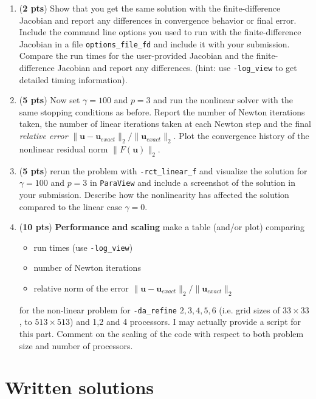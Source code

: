 \documentclass[11pt]{article}
\begin{document}
\begin{enumerate}
    \item (\textbf{2 pts}) Show that you get the same solution with the finite-difference Jacobian and report any differences in convergence behavior or final error. Include the command line options you used to run with the finite-difference Jacobian in a file \texttt{options\_file\_fd} and include it with your submission. Compare the run times for the user-provided Jacobian and the finite-difference Jacobian and report any differences. (hint: use \texttt{-log\_view} to get detailed timing information).
    \item (\textbf{5 pts}) Now set $\gamma=100$ and $p=3$ and run the nonlinear solver with the same stopping conditions as before. Report the number of Newton iterations taken, the number of linear iterations taken at each Newton step and the final \emph{relative error} $\|\mathbf{u}-\mathbf{u}_{exact}\|_2/\|\mathbf{u}_{exact}\|_2$. Plot the convergence history of the nonlinear residual norm $\|F(\mathbf{u})\|_2$.
    \item (\textbf{5 pts}) rerun the problem with \texttt{-rct\_linear\_f} and visualize the solution for $\gamma=100$ and $p=3$ in \texttt{ParaView} and include a screenshot of the solution in your submission. Describe how the nonlinearity has affected the solution compared to the linear case $\gamma=0$.
    \item (\textbf{10 pts}) \textbf{Performance and scaling} make a table (and/or plot) comparing
      \begin{itemize}
        \item run times (use \texttt{-log\_view})
        \item  number of Newton iterations
        \item relative norm of the error $\|\mathbf{u}-\mathbf{u}_{exact}\|_2/\|\mathbf{u}_{exact}\|_2$
      \end{itemize}
      for the non-linear problem for \texttt{-da\_refine} $2,3,4,5,6$ (i.e. grid sizes of $33\times 33$, to $513\times 513$) and 1,2 and 4 processors. I may actually provide a script for this part. Comment on the scaling of the code with respect to both problem size and number of processors.
  \end{enumerate}

\section*{Written solutions}
\end{document}
